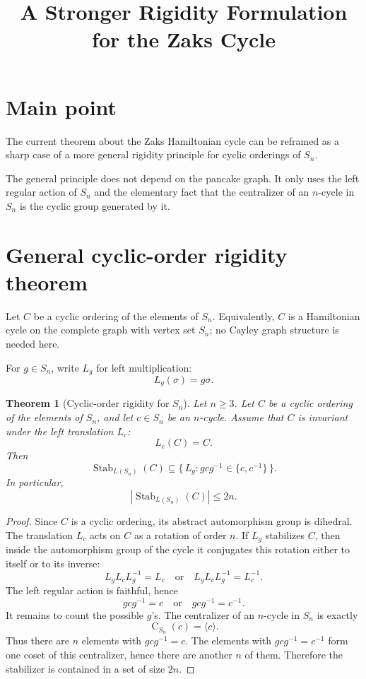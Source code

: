 \documentclass[11pt]{article}
\title{A Stronger Rigidity Formulation for the Zaks Cycle}
\author{}
\date{}
\newtheorem{theorem}{Theorem}
\newcommand{\Stab}{\operatorname{Stab}}
\newcommand{\Cent}{\operatorname{C}}
\begin{document}
\maketitle

\section*{Main point}

The current theorem about the Zaks Hamiltonian cycle can be reframed as a sharp
case of a more general rigidity principle for cyclic orderings of $S_n$.

The general principle does not depend on the pancake graph. It only uses the
left regular action of $S_n$ and the elementary fact that the centralizer of an
$n$-cycle in $S_n$ is the cyclic group generated by it.

\section*{General cyclic-order rigidity theorem}

Let $C$ be a cyclic ordering of the elements of $S_n$. Equivalently, $C$ is a
Hamiltonian cycle on the complete graph with vertex set $S_n$; no Cayley graph
structure is needed here.

For $g \in S_n$, write $L_g$ for left multiplication:
\[
  L_g(\sigma)=g\sigma.
\]

\begin{theorem}[Cyclic-order rigidity for $S_n$]
Let $n\geq 3$. Let $C$ be a cyclic ordering of the elements of $S_n$, and let
$c \in S_n$ be an $n$-cycle. Assume that $C$ is invariant under the left
translation $L_c$:
\[
  L_c(C)=C.
\]
Then
\[
  \Stab_{L(S_n)}(C)
  \subseteq
  \{\,L_g : g c g^{-1}\in\{c,c^{-1}\}\,\}.
\]
In particular,
\[
  |\Stab_{L(S_n)}(C)| \leq 2n.
\]
\end{theorem}

\begin{proof}
Since $C$ is a cyclic ordering, its abstract automorphism group is dihedral. The
translation $L_c$ acts on $C$ as a rotation of order $n$. If $L_g$ stabilizes
$C$, then inside the automorphism group of the cycle it conjugates this rotation
either to itself or to its inverse:
\[
  L_g L_c L_g^{-1}=L_c
  \quad\text{or}\quad
  L_g L_c L_g^{-1}=L_c^{-1}.
\]
The left regular action is faithful, hence
\[
  g c g^{-1}=c
  \quad\text{or}\quad
  g c g^{-1}=c^{-1}.
\]
It remains to count the possible $g$'s. The centralizer of an $n$-cycle in
$S_n$ is exactly
\[
  \Cent_{S_n}(c)=\langle c\rangle.
\]
Thus there are $n$ elements with $g c g^{-1}=c$. The elements with
$g c g^{-1}=c^{-1}$ form one coset of this centralizer, hence there are another
$n$ of them. Therefore the stabilizer is contained in a set of size $2n$.
\end{proof}
\end{document}
